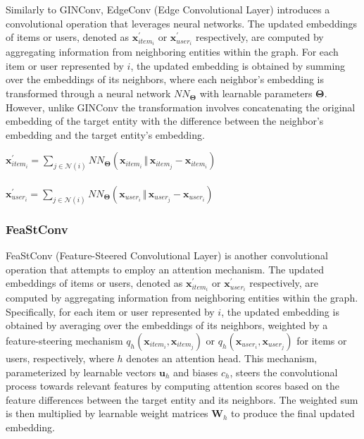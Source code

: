 \documentclass{scrartcl}
\begin{document}
\quad Similarly to GINConv, EdgeConv (Edge Convolutional Layer) introduces a convolutional operation that leverages neural networks. The updated embeddings of items or users, denoted as $\mathbf{x}^{\prime}_{item_i}$ or $\mathbf{x}^{\prime}_{user_i}$ respectively, are computed by aggregating information from neighboring entities within the graph. For each item or user represented by $i$, the updated embedding is obtained by summing over the embeddings of its neighbors, where each neighbor's embedding is transformed through a neural network $NN_{\mathbf{\Theta}}$ with learnable parameters $\mathbf{\Theta}$. However, unlike GINConv the transformation involves concatenating the original embedding of the target entity with the difference between the neighbor's embedding and the target entity's embedding. \\ 

\begin{center}
    $\mathbf{x}^{\prime}_{item_{i}} = \sum_{j \in \mathcal{N}(i)} NN_{\mathbf{\Theta}}(\mathbf{x}_{item_{i}} \, \Vert \, \mathbf{x}_{item_{j}} - \mathbf{x}_{item_{i}})$ \\~\\
    $\mathbf{x}^{\prime}_{user_{i}} = \sum_{j \in \mathcal{N}(i)} NN_{\mathbf{\Theta}}(\mathbf{x}_{user_{i}} \, \Vert \, \mathbf{x}_{user_{j}} - \mathbf{x}_{user_{i}})$
\end{center}


\subsubsection{FeaStConv\cite{feastconv}} 

\quad FeaStConv (Feature-Steered Convolutional Layer) is another  convolutional operation that attempts to employ an attention mechanism. The updated embeddings of items or users, denoted as $\mathbf{x}^{\prime}_{item_i}$ or $\mathbf{x}^{\prime}_{user_i}$ respectively, are computed by aggregating information from neighboring entities within the graph. Specifically, for each item or user represented by $i$, the updated embedding is obtained by averaging over the embeddings of its neighbors, weighted by a feature-steering mechanism $q_h(\mathbf{x}_{item_i}, \mathbf{x}_{item_j})$ or $q_h(\mathbf{x}_{user_i}, \mathbf{x}_{user_j})$ for items or users, respectively, where $h$ denotes an attention head. This mechanism, parameterized by learnable vectors $\mathbf{u}_h$ and biases $c_h$, steers the convolutional process towards relevant features by computing attention scores based on the feature differences between the target entity and its neighbors. The weighted sum is then multiplied by learnable weight matrices $\mathbf{W}_h$ to produce the final updated embedding. \\ 
\end{document}
